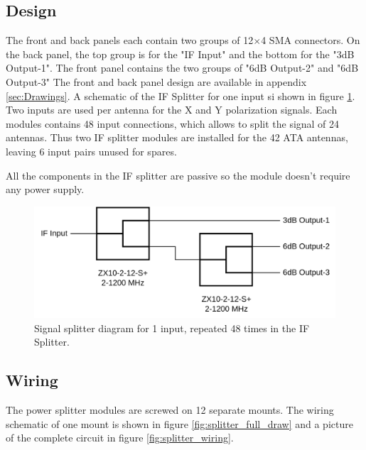 \documentclass[12pt,a4paper,oneside]{article}
\begin{document}
\subsection{Design}
\label{sec:Design}
The front and back panels each contain two groups of 12$\times$4 SMA connectors. On the back panel, the top group is for the "IF Input" and the bottom for the "3dB Output-1". The front panel contains the two groups of "6dB Output-2" and "6dB Output-3" The front and back panel design are available in appendix \ref{sec:Drawings}. A schematic of the IF Splitter for one input si shown in figure \ref{fig:IF_Splitter_Diagram}. Two inputs are used per antenna for the X and Y polarization signals. Each modules contains 48 input connections, which allows to split the signal of 24 antennas. Thus two IF splitter modules are installed for the 42 ATA antennas, leaving 6 input pairs unused for spares.

All the components in the IF splitter are passive so the module doesn't require any power supply.

%
\begin{figure}[H]
\centering
\includegraphics[width=1\linewidth]{schematics/IF_splitter.drawio.png}
\caption{Signal splitter diagram for 1 input, repeated 48 times in the IF Splitter.}
\label{fig:IF_Splitter_Diagram}
\end{figure}
%

\subsection{Wiring}
\label{sec:Wiring}
The power splitter modules are screwed on 12 separate mounts. The wiring schematic of one mount is shown in figure \ref{fig:splitter_full_draw} and a picture of the complete circuit in figure \ref{fig:splitter_wiring}.
\end{document}
